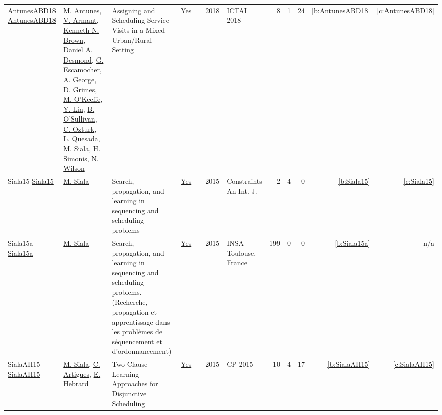 {\begin{longtable}{>{\raggedright\arraybackslash}p{3cm}>{\raggedright\arraybackslash}p{6cm}>{\raggedright\arraybackslash}p{6.5cm}rrrp{2.5cm}rrrrr}
AntunesABD18 \href{https://doi.org/10.1109/ICTAI.2018.00027}{AntunesABD18} & \hyperref[auth:a891]{M. Antunes}, \hyperref[auth:a892]{V. Armant}, \hyperref[auth:a223]{Kenneth N. Brown}, \hyperref[auth:a893]{Daniel A. Desmond}, \hyperref[auth:a894]{G. Escamocher}, \hyperref[auth:a895]{A. George}, \hyperref[auth:a183]{D. Grimes}, \hyperref[auth:a896]{M. O'Keeffe}, \hyperref[auth:a897]{Y. Lin}, \hyperref[auth:a16]{B. O'Sullivan}, \hyperref[auth:a898]{C. Ozturk}, \hyperref[auth:a899]{L. Quesada}, \hyperref[auth:a130]{M. Siala}, \hyperref[auth:a17]{H. Simonis}, \hyperref[auth:a838]{N. Wilson} & Assigning and Scheduling Service Visits in a Mixed Urban/Rural Setting & \href{../works/AntunesABD18.pdf}{Yes} & \cite{AntunesABD18} & 2018 & ICTAI 2018 & 8 & 1 & 24 & \ref{b:AntunesABD18} & \ref{c:AntunesABD18}\\
Siala15 \href{https://doi.org/10.1007/s10601-015-9213-y}{Siala15} & \hyperref[auth:a130]{M. Siala} & Search, propagation, and learning in sequencing and scheduling problems & \href{../works/Siala15.pdf}{Yes} & \cite{Siala15} & 2015 & Constraints An Int. J. & 2 & 4 & 0 & \ref{b:Siala15} & \ref{c:Siala15}\\
Siala15a \href{https://tel.archives-ouvertes.fr/tel-01164291}{Siala15a} & \hyperref[auth:a130]{M. Siala} & Search, propagation, and learning in sequencing and scheduling problems. (Recherche, propagation et apprentissage dans les probl{\`{e}}mes de s{\'{e}}quencement et d'ordonnancement) & \href{../works/Siala15a.pdf}{Yes} & \cite{Siala15a} & 2015 & {INSA} Toulouse, France & 199 & 0 & 0 & \ref{b:Siala15a} & n/a\\
SialaAH15 \href{https://doi.org/10.1007/978-3-319-23219-5\_28}{SialaAH15} & \hyperref[auth:a130]{M. Siala}, \hyperref[auth:a6]{C. Artigues}, \hyperref[auth:a1]{E. Hebrard} & Two Clause Learning Approaches for Disjunctive Scheduling & \href{../works/SialaAH15.pdf}{Yes} & \cite{SialaAH15} & 2015 & CP 2015 & 10 & 4 & 17 & \ref{b:SialaAH15} & \ref{c:SialaAH15}\\
\end{longtable}
}

\clearpage
